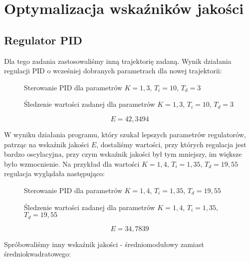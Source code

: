 \chapter{Optymalizacja wskaźników jakości}

\section{Regulator PID}

Dla tego zadania zastosowaliśmy inną trajektorię zadaną. Wynik działania regulacji PID o wcześniej dobranych parametrach dla nowej trajektorii:

\begin{figure}[H]
\centering

\caption{Sterowanie PID dla parametrów $K = 1,3$, $T_i = 10$, $T_d = 3$}
\end{figure}

\begin{figure}[H]
\centering

\caption{Śledzenie wartości zadanej dla parametrów $K = 1,3$, $T_i = 10$, $T_d = 3$}
\end{figure}

\begin{equation}
E = 42,3494
\end{equation}

W wyniku działania programu, który szukał lepszych parametrów regulatorów, patrząc na wskaźnik jakości $E$, dostaliśmy wartości, przy których regulacja jest bardzo oscylacyjna, przy czym wskaźnik jakości był tym mniejszy, im większe było wzmocnienie. Na przykład dla wartości $K=1,4$, $T_i=1,35$, $T_d=19,55$ regulacja wyglądała następująco:

\begin{figure}[H]
\centering

\caption{Sterowanie PID dla parametrów $K=1,4$, $T_i=1,35$,  $T_d=19,55$}
\end{figure}

\begin{figure}[H]
\centering

\caption{Śledzenie wartości zadanej dla parametrów $K=1,4$, $T_i=1,35$,  $T_d=19,55$}
\end{figure}

\begin{equation}
E = 34,7839
\end{equation}

Spróbowaliśmy inny wskaźnik jakości - średniomodułowy zamiast średniokwadratowego:

